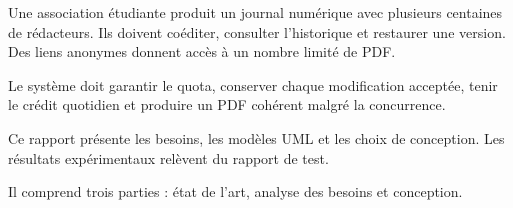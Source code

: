 Une association étudiante produit un journal numérique avec plusieurs centaines de rédacteurs. Ils doivent coéditer, consulter l'historique et restaurer une version. Des liens anonymes donnent accès à un nombre limité de PDF.


Le système doit garantir le quota, conserver chaque modification acceptée, tenir le crédit quotidien et produire un PDF cohérent malgré la concurrence.


Ce rapport présente les besoins, les modèles UML et les choix de conception. Les résultats expérimentaux relèvent du rapport de test.

Il comprend trois parties : état de l'art, analyse des besoins et conception.
